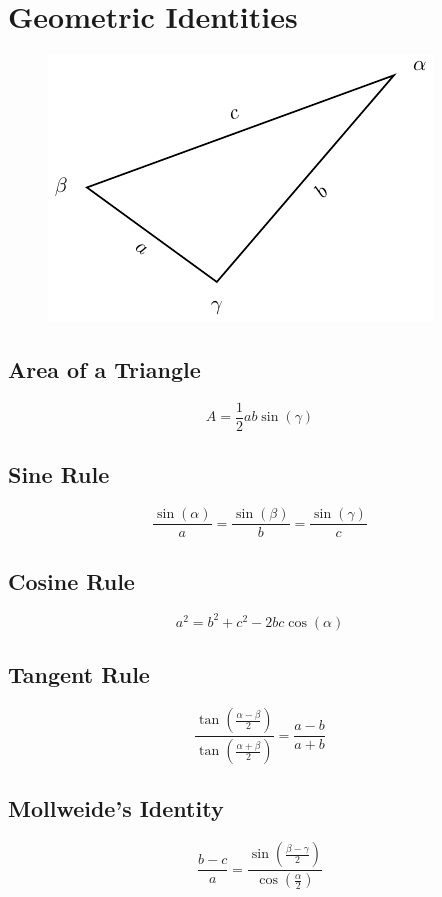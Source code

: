 \documentclass{article}
\begin{document}
\section{Geometric Identities}
\begin{figure}[H]
    \centering
    \includegraphics*{figures/triangle.pdf}
\end{figure}
\subsection{Area of a Triangle}
\begin{equation*}
    A=\frac{1}{2}a b \sin{\left( \gamma \right)}
\end{equation*}
\subsection{Sine Rule}
\begin{equation*}
    \frac{\sin{\left( \alpha \right)}}{a} = \frac{\sin{\left( \beta \right)}}{b} = \frac{\sin{\left( \gamma \right)}}{c}
\end{equation*}
\subsection{Cosine Rule}
\begin{equation*}
    a^2=b^2+c^2-2b c\cos{\left( \alpha \right)}
\end{equation*}
\subsection{Tangent Rule}
\begin{equation*}
    \frac{\tan{\left( \frac{\alpha-\beta}{2} \right)}}{\tan{\left( \frac{\alpha+\beta}{2} \right)}} = \frac{a-b}{a+b}
\end{equation*}
\subsection{Mollweide's Identity}
\begin{equation*}
    \frac{b-c}{a}=\frac{\sin{\left( \frac{\beta-\gamma}{2} \right)}}{\cos{\left( \frac{\alpha}{2} \right)}}
\end{equation*}
\end{document}
